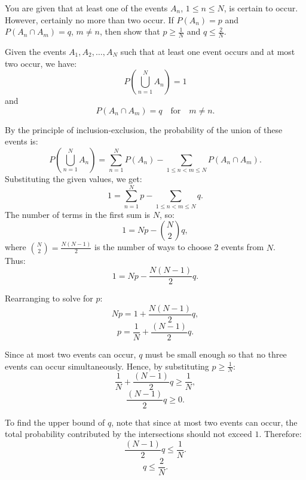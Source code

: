 \begin{exercise}
    You are given that at least one of the events $A_n$, $1 \leq n \leq N$, is certain to occur. However, certainly no more than two occur. If $P(A_n) = p$ and $P(A_n \cap A_m) = q$, $m \neq n$, then show that $p \geq \frac{1}{N}$ and $q \leq \frac{2}{N}$. 
\end{exercise}

\begin{solution}

    Given the events $A_1, A_2, \ldots, A_N$ such that at least one event occurs and at most two occur, we have:
\[
P\left(\bigcup_{n=1}^{N} A_n\right) = 1
\]
and
\[
P\left(A_n \cap A_m\right) = q \quad \text{for} \quad m \neq n.
\]

By the principle of inclusion-exclusion, the probability of the union of these events is:
\[
P\left(\bigcup_{n=1}^{N} A_n\right) = \sum_{n=1}^{N} P(A_n) - \sum_{1 \leq n < m \leq N} P(A_n \cap A_m).
\]
Substituting the given values, we get:
\[
1 = \sum_{n=1}^{N} p - \sum_{1 \leq n < m \leq N} q.
\]
The number of terms in the first sum is $N$, so:
\[
1 = Np - \binom{N}{2}q,
\]
where $\binom{N}{2} = \frac{N(N-1)}{2}$ is the number of ways to choose 2 events from $N$.\\

Thus:
\[
1 = Np - \frac{N(N-1)}{2}q.
\]

Rearranging to solve for $p$:
\[
Np = 1 + \frac{N(N-1)}{2}q,
\]
\[
p = \frac{1}{N} + \frac{(N-1)}{2}q.
\]

Since at most two events can occur, $q$ must be small enough so that no three events can occur simultaneously. Hence, by substituting $p \geq \frac{1}{N}$:
\[
\frac{1}{N} + \frac{(N-1)}{2}q \geq \frac{1}{N},
\]
\[
\frac{(N-1)}{2}q \geq 0.
\]

To find the upper bound of $q$, note that since at most two events can occur, the total probability contributed by the intersections should not exceed $1$. Therefore:
\[
\frac{(N-1)}{2}q \leq \frac{1}{N}.
\]
\[
q \leq \frac{2}{N}.
\]
\end{solution}

